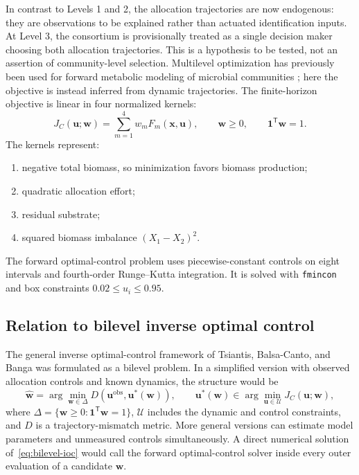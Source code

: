 \documentclass[11pt,a4paper]{article}
\newcommand{\vect}[1]{\boldsymbol{#1}}
\begin{document}
In contrast to Levels 1 and 2, the allocation trajectories are now endogenous:
they are observations to be explained rather than actuated identification
inputs. At Level 3, the consortium is provisionally treated as a single
decision maker choosing both allocation trajectories. This is a hypothesis to
be tested, not an assertion of community-level selection. Multilevel
optimization has previously been used for forward metabolic modeling of
microbial communities \cite{Zomorrodi2012}; here the objective is instead
inferred from dynamic trajectories. The finite-horizon objective is linear in
four normalized kernels:
\begin{equation}
  J_C(\vect{u};\vect{w}) =
  \sum_{m=1}^{4}w_m F_m(\vect{x},\vect{u}),
  \qquad
  \vect{w}\ge 0,\qquad
  \vect{1}^{\mathsf T}\vect{w}=1.
\end{equation}
The kernels represent:
\begin{enumerate}
  \item negative total biomass, so minimization favors biomass production;
  \item quadratic allocation effort;
  \item residual substrate;
  \item squared biomass imbalance \((X_1-X_2)^2\).
\end{enumerate}

The forward optimal-control problem uses piecewise-constant controls on eight
intervals and fourth-order Runge--Kutta integration. It is solved with
\texttt{fmincon} and box constraints \(0.02\le u_i\le0.95\).

\subsection{Relation to bilevel inverse optimal control}

The general inverse optimal-control framework of Tsiantis, Balsa-Canto, and
Banga \cite{Tsiantis2018} was formulated as a bilevel problem. In a simplified
version with observed allocation controls and known dynamics, the structure
would be
\begin{equation}
  \hat{\vect{w}}
  =
  \arg\min_{\vect{w}\in\Delta}
  D\!\left(\vect{u}^{\mathrm{obs}},\vect{u}^{*}(\vect{w})\right),
  \qquad
  \vect{u}^{*}(\vect{w})
  \in
  \arg\min_{\vect{u}\in\mathcal{U}}
  J_C(\vect{u};\vect{w}),
  \label{eq:bilevel-ioc}
\end{equation}
where \(\Delta=\{\vect{w}\ge0:\vect{1}^{\mathsf T}\vect{w}=1\}\),
\(\mathcal{U}\) includes the dynamic and control constraints, and \(D\) is a
trajectory-mismatch metric. More general versions can estimate model
parameters and unmeasured controls simultaneously. A direct numerical
solution of~\eqref{eq:bilevel-ioc} would call the forward optimal-control
solver inside every outer evaluation of a candidate \(\vect{w}\).
\end{document}
